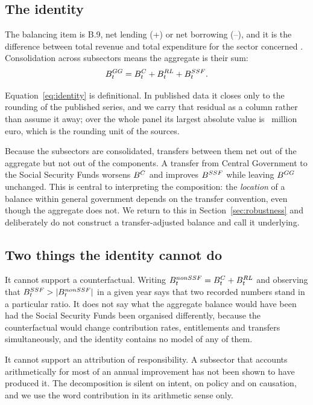 \subsection{The identity}

The balancing item is B.9, net lending (+) or net borrowing (--), and it is the
difference between total revenue and total expenditure for the sector concerned
\citep{eurostat_gov_main}. Consolidation across subsectors means the aggregate is
their sum:
\begin{equation}
B^{GG}_t = B^{C}_t + B^{RL}_t + B^{SSF}_t.
\label{eq:identity}
\end{equation}

Equation~\eqref{eq:identity} is definitional. In published data it closes only to
the rounding of the published series, and we carry that residual as a column rather
than assume it away; over the whole panel its largest absolute value is
\MaxClosureResidual\ million euro, which is the rounding unit of the sources.

Because the subsectors are consolidated, transfers between them net out of the
aggregate but not out of the components. A transfer from Central Government to the
Social Security Funds worsens $B^{C}$ and improves $B^{SSF}$ while leaving $B^{GG}$
unchanged. This is central to interpreting the composition: the \emph{location} of
a balance within general government depends on the transfer convention, even though
the aggregate does not. We return to this in Section~\ref{sec:robustness} and
deliberately do not construct a transfer-adjusted balance and call it underlying.

\subsection{Two things the identity cannot do}

It cannot support a counterfactual. Writing
$B^{nonSSF}_t = B^{C}_t + B^{RL}_t$ and observing that $B^{SSF}_t > |B^{nonSSF}_t|$ in a
given year says that two recorded numbers stand in a particular ratio. It does not
say what the aggregate balance would have been had the Social Security Funds been
organised differently, because the counterfactual would change contribution rates,
entitlements and transfers simultaneously, and the identity contains no model of
any of them.

It cannot support an attribution of responsibility. A subsector that accounts
arithmetically for most of an annual improvement has not been shown to have
produced it. The decomposition is silent on intent, on policy and on causation, and
we use the word contribution in its arithmetic sense only.
